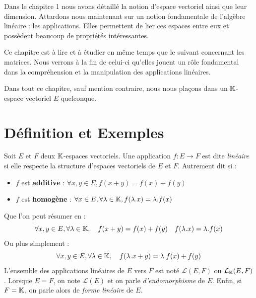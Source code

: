
\minitoc  %

Dans le chapitre 1 nous avons détaillé la notion d'espace vectoriel ainsi que leur dimension. 
Attardons nous maintenant sur un notion fondamentale de l'algèbre linéaire : les applications. 
Elles permettent de lier ces espaces entre eux et possèdent beaucoup de propriétés intéressantes. 

Ce chapitre est à lire et à étudier en même temps que le suivant concernant les matrices. Nous verrons à la fin de celui-ci 
qu'elles jouent un rôle fondamental dans la compréhension et la manipulation des applications linéaires. 

\vspace{0.3cm}

Dans tout ce chapitre, sauf mention contraire, nous nous plaçons dans un $\mathbb{K}$-espace vectoriel $E$ quelconque. 


\section{Définition et Exemples}

\begin{definition}
    Soit $E$ et $F$ deux $\mathbb{K}$-espaces vectoriels. Une {application} $f : E \longrightarrow F$ est dite 
    \emph{linéaire} si elle respecte la structure d'espaces vectoriels de $E$ et $F$. 
    Autrement dit si :  
    \begin{itemize}
        \item $f$ est \textbf{additive} : $ \forall x,y \in E, f(x+y) = f(x) + f(y) $ 
        \item $f$ est \textbf{homogène} : $ \forall x \in E, \forall \lambda \in \mathbb{K}, f(\lambda.x) = \lambda . f(x) $ 
    \end{itemize}
    Que l'on peut résumer en : 
        \[ \forall x,y \in E, \forall \lambda \in \mathbb{K}, \quad f(x+y) = f(x) + f(y) \quad f(\lambda.x) = \lambda . f(x) \] 
    Ou plus simplement : 
        \[ \forall x,y \in E, \forall \lambda \in \mathbb{K}, \quad f(\lambda. x+y) = \lambda. f(x) + f(y) \] 
    L'ensemble des applications linéaires de $E$ vers $F$ est noté $ \mathcal{L}(E,F)$ ou $ \mathcal{L}_{\mathbb{K}}(E,F)$. 
    Lorsque $E = F$, on note $ \mathcal{L}(E)$ et on parle \emph{d'endomorphisme} de $E$. 
    Enfin, si $F = \mathbb{K}$, on parle alors de \emph{forme linéaire} de $E$. 
\end{definition}

